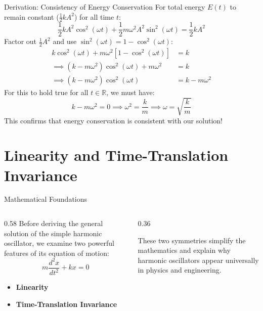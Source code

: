 \documentclass[aspectratio=169,xcolor=dvipsnames]{beamer}
\begin{document}
\begin{frame}{Derivation: Consistency of Energy Conservation}
  For total energy $E(t)$ to remain constant ($\frac{1}{2}kA^2$) for all time $t$:
  \[
    \frac{1}{2}kA^2\cos^2(\omega t) + \frac{1}{2}m\omega^2 A^2\sin^2(\omega t) = \frac{1}{2}kA^2
  \]
  \pause
  Factor out $\frac{1}{2}A^2$ and use $\sin^2(\omega t) = 1 - \cos^2(\omega t)$:
  \begin{align*}
    k\cos^2(\omega t) + m\omega^2\left[1 - \cos^2(\omega t)\right] & = k             \\
    \implies (k - m\omega^2)\cos^2(\omega t) + m\omega^2           & = k             \\
    \implies (k - m\omega^2)\cos^2(\omega t)                       & = k - m\omega^2
  \end{align*}
  \pause
  For this to hold true for all $t \in \mathbb{R}$, we must have:
  \[
    k - m\omega^2 = 0 \implies \omega^2 = \frac{k}{m} \implies \omega = \sqrt{\frac{k}{m}}
  \]
  This confirms that energy conservation is consistent with our solution!
\end{frame}

\section{Linearity and Time-Translation Invariance}

\begin{frame}{Mathematical Foundations}
  \begin{columns}[c]
    \begin{column}{0.58\textwidth}
      Before deriving the general solution of the simple harmonic oscillator, we examine two powerful features of its equation of motion:
      \vspace{0.5em}
      \[
        m\frac{d^2x}{dt^2} + kx = 0
      \]
      \vspace{0.5em}
      \begin{itemize}
        \item \textbf{Linearity}
        \item \textbf{Time-Translation Invariance}
      \end{itemize}
    \end{column}
    \hfill
    \begin{column}{0.36\textwidth}
      \begin{umnote}
        These two symmetries simplify the mathematics and explain why harmonic oscillators appear universally in physics and engineering.
      \end{umnote}
    \end{column}
  \end{columns}
\end{frame}
\end{document}
